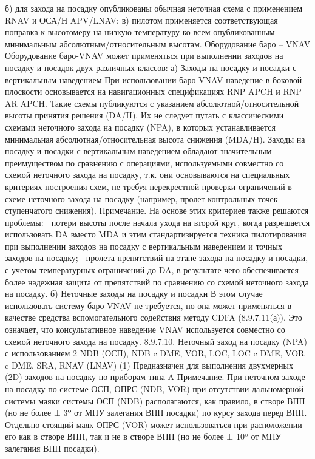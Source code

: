 б)	для захода на посадку опубликованы обычная неточная схема с применением RNAV и ОСА/Н APV/LNAV;
в)	пилотом применяется соответствующая поправка к высотомеру на низкую температуру ко всем опубликованным минимальным абсолютным/относительным высотам.
Оборудование баро – VNAV
Оборудование баро-VNAV может применяться при выполнении заходов на посадку и посадок двух различных классов:
а)	Заходы на посадку и посадки с вертикальным наведением
При использовании баро-VNAV наведение в боковой плоскости основывается на навигационных спецификациях RNP APCH и RNP AR APCH. Такие схемы публикуются с указанием абсолютной/относительной высоты принятия решения (DA/H). Их не следует путать с классическими схемами неточного захода на посадку (NPA), в которых устанавливается минимальная абсолютная/относительная высота снижения (MDA/H).
Заходы на посадку и посадки с вертикальным наведением обладают значительным преимуществом по сравнению с операциями, используемыми совместно со схемой неточного захода на посадку, т.к. они основываются на специальных критериях построения схем, не требуя перекрестной проверки ограничений в схеме неточного захода на посадку (например, пролет контрольных точек ступенчатого снижения).
Примечание. На основе этих критериев также решаются проблемы:
 потери высоты после начала ухода на второй круг, когда разрешается использовать DA вместо MDA и этим стандартизируется техника пилотирования при выполнении заходов на посадку с вертикальным наведением и точных заходов на посадку;
 пролета препятствий на этапе захода на посадку и посадки, с учетом температурных ограничений до DA, в результате чего обеспечивается более надежная защита от препятствий по сравнению со схемой неточного захода на посадку.
б)	Неточные заходы на посадку и посадки
В этом случае использовать систему баро-VNAV не требуется, но она может применяться в качестве средства вспомогательного содействия методу CDFA (8.9.7.11(а)). Это означает, что консультативное наведение VNAV используется совместно со схемой неточного захода на посадку.
8.9.7.10.	Неточный заход на посадку (NPA) с использованием 2 NDB (ОСП), NDB c DME, VOR, 
                                        LOC, LOC c DME, VOR c DME, SRA, RNAV (LNAV)
(1) Предназначен для выполнения двухмерных (2D) заходов на посадку по приборам типа A
Примечание. При неточном заходе на посадку по системе ОСП, ОПРС (NDB, VOR) при отсутствии дальномерной системы маяки системы ОСП (NDB) располагаются, как правило, в створе ВПП (но не более ± 3º от МПУ залегания ВПП посадки) по курсу захода перед ВПП. Отдельно стоящий маяк ОПРС (VOR) может использоваться при расположении его как в створе ВПП, так и не в створе ВПП (но не более ± 10º от МПУ залегания ВПП посадки). 
